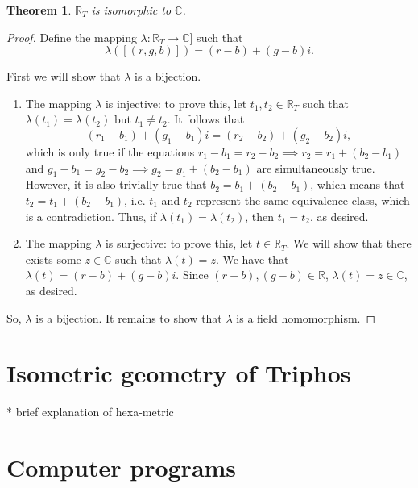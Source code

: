 \documentclass{article}
\theoremstyle{plain}
\newtheorem{theorem}{Theorem}
\theoremstyle{definition}
\newcommand{\Tri}{\mathbb{R}_T}
\begin{document}
	\begin{theorem}
		$\Tri$ is isomorphic to $\mathbb{C}$.
	\end{theorem}

	\begin{proof}
		Define the mapping \(\lambda: \Tri \to \mathbb{C}]\) such that
		\[\lambda([(r, g, b)]) = (r - b) + (g - b)i.\]

		First we will show that \(\lambda\) is a bijection.
		\begin{enumerate}
			\item The mapping \(\lambda\) is injective: to prove this, let
			$t_1, t_2 \in \Tri$ such that \(\lambda(t_1) = \lambda(t_2)\) but
			\(t_1 \neq t_2\). It follows that
			\[(r_1 - b_1) + (g_1 - b_1)i = (r_2 - b_2) + (g_2 - b_2)i,\]
			which is only true if the equations \(r_1 - b_1 = r_2 - b_2
			\implies r_2 = r_1 + (b_2 - b_1)\) and \(g_1 - b_1 = g_2 - b_2
			\implies g_2 = g_1 + (b_2 - b_1)\) are simultaneously true.
			However, it is also trivially true that \(b_2 = b_1 + (b_2 -
			b_1)\), which means that \(t_2 = t_1 + (b_2 - b_1)\), i.e. \(t_1\)
			and \(t_2\) represent the same equivalence class, which is a
			contradiction. Thus, if \(\lambda(t_1) = \lambda(t_2)\), then \(t_1
			= t_2\), as desired.
			\item The mapping \(\lambda\) is surjective: to prove this, let $t
			\in \Tri$. We will show that there exists some \(z \in
			\mathbb{C}\) such that \(\lambda(t) = z\). We have that $\lambda(t)
			= (r - b) + (g - b)i$. Since $(r - b), (g - b) \in \mathbb{R}$,
			$\lambda(t) = z \in \mathbb{C}$, as desired.
		\end{enumerate}

		So, \(\lambda\) is a bijection. It remains to show that $\lambda$ is a
		field homomorphism.
	\end{proof}

	\section{Isometric geometry of Triphos}

	* brief explanation of hexa-metric

	\section{Computer programs}

	
	
\end{document}
